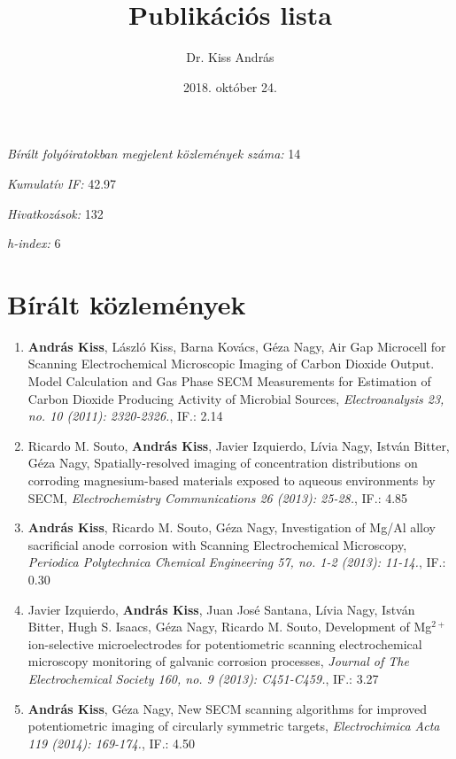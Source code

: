 \documentclass[11pt,a4paper,roman]{article}
\date{2018. október 24.}
\title{Publikációs lista}
\author{Dr. Kiss András}
\begin{document}
\maketitle

\emph{Bírált folyóiratokban megjelent közlemények száma:} 14

\emph{Kumulatív IF:} 42.97

\emph{Hivatkozások:} 132

\emph{h-index:} 6

\section{Bírált közlemények}
\begin{enumerate}

\item \textbf{András Kiss}, László Kiss, Barna Kovács, Géza Nagy, Air Gap Microcell for Scanning Electrochemical Microscopic Imaging of Carbon Dioxide Output. Model Calculation and Gas Phase SECM Measurements for Estimation of Carbon Dioxide Producing Activity of Microbial Sources, \emph{Electroanalysis 23, no. 10 (2011): 2320-2326.}, IF.: 2.14

\item Ricardo M. Souto, \textbf{András Kiss}, Javier Izquierdo, Lívia Nagy, István Bitter, Géza Nagy, Spatially-resolved imaging of concentration distributions on corroding mag\-ne\-si\-um-based materials exposed to aqueous environments by SECM, \emph{Electrochemistry Communications 26 (2013): 25-28.}, IF.: 4.85

\item \textbf{András Kiss}, Ricardo M. Souto, Géza Nagy, Investigation of Mg/Al alloy sacrificial anode corrosion with Scanning Electrochemical Microscopy, \emph{Periodica Polytechnica Chemical Engineering 57, no. 1-2 (2013): 11-14.}, IF.: 0.30

\item Javier Izquierdo, \textbf{András Kiss}, Juan José Santana, Lívia Nagy, István Bitter, Hugh S. Isaacs, Géza Nagy, Ricardo M. Souto, Development of Mg$^{2+}$ ion-selective microelectrodes for potentiometric scanning electrochemical microscopy monitoring of galvanic corrosion processes, \emph{Journal of The Electrochemical Society 160, no. 9 (2013): C451-C459.}, IF.: 3.27

\item \textbf{András Kiss}, Géza Nagy, New SECM scanning algorithms for improved potentiometric imaging of circularly symmetric targets, \emph{Electrochimica Acta 119 (2014): 169-174.}, IF.: 4.50


\end{enumerate}
\end{document}

